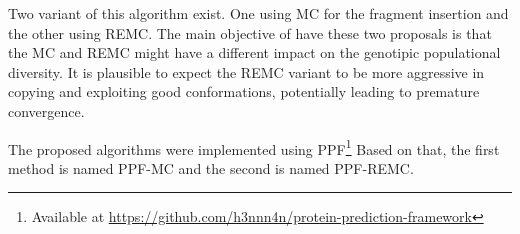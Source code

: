 Two variant of this algorithm exist. One using \ac{MC} for the fragment insertion
and the other using \ac{REMC}.
The main objective of have these two proposals is that the \ac{MC} and \ac{REMC}
might have a different impact on the genotipic populational diversity. It is
plausible to expect the \ac{REMC} variant to be more aggressive in copying and
exploiting good conformations, potentially leading to premature convergence.

The proposed algorithms were implemented using
\ac{PPF}\footnote{Available at
\url{https://github.com/h3nnn4n/protein-prediction-framework}}
Based on that, the
first method is named PPF-MC and the second is named PPF-REMC.
